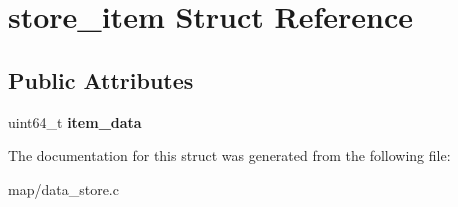 \hypertarget{structstore__item}{}\section{store\+\_\+item Struct Reference}
\label{structstore__item}
\subsection*{Public Attributes}
\begin{DoxyCompactItemize}
\item 
\mbox{\label{structstore__item_a90b24ed499b0c93459f66382eb405914}} 
uint64\+\_\+t {\bfseries item\+\_\+data}
\end{DoxyCompactItemize}


The documentation for this struct was generated from the following file\+:\begin{DoxyCompactItemize}
\item 
map/data\+\_\+store.\+c\end{DoxyCompactItemize}
